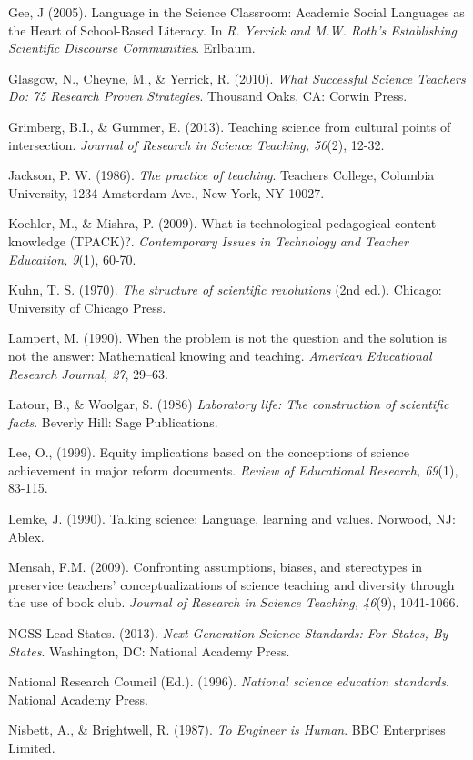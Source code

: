 \documentclass[11.5pt]{sig-alternate} %
\begin{document}
Gee, J (2005). Language in the Science Classroom: Academic Social Languages as the Heart of School-Based Literacy.  In \textit{R. Yerrick and M.W. Roth’s Establishing Scientific Discourse Communities}.  Erlbaum. 

Glasgow, N., Cheyne, M., \& Yerrick, R. (2010). \textit{What Successful Science Teachers Do: 75 Research Proven Strategies}. Thousand Oaks, CA: Corwin Press.

Grimberg, B.I., \& Gummer, E. (2013). Teaching science from cultural points of intersection. \textit{Journal of Research in Science Teaching, 50}(2), 12-32.

Jackson, P. W. (1986). \textit{The practice of teaching}. Teachers College, Columbia University, 1234 Amsterdam Ave., New York, NY 10027.

Koehler, M., \& Mishra, P. (2009). What is technological pedagogical content knowledge (TPACK)?. \textit{Contemporary Issues in Technology and Teacher Education, 9}(1), 60-70.

Kuhn, T. S. (1970). \textit{The structure of scientific revolutions} (2nd ed.). Chicago: University of Chicago Press.

Lampert, M. (1990). When the problem is not the question and the solution is not the answer: Mathematical knowing and teaching. \textit{American Educational Research Journal, 27}, 29–63.

Latour, B., \& Woolgar, S. (1986) \textit{Laboratory life: The construction of scientific facts}. Beverly Hill: Sage Publications.	

Lee, O., (1999). Equity implications based on the conceptions of science achievement in major reform documents. \textit{Review of Educational Research, 69}(1), 83-115.

Lemke, J. (1990). Talking science: Language, learning and values. Norwood, NJ: Ablex. 

Mensah, F.M. (2009). Confronting assumptions, biases, and stereotypes in preservice teachers’ conceptualizations of science teaching and diversity through the use of book club. \textit{Journal of Research in Science Teaching, 46}(9), 1041-1066.

NGSS Lead States. (2013). \textit{Next Generation Science Standards: For States, By States}. Washington, DC: National Academy Press.

National Research Council (Ed.). (1996). \textit{National science education standards}. National Academy Press.

Nisbett, A., \& Brightwell, R. (1987). \textit{To Engineer is Human}. BBC Enterprises Limited.
\end{document}
